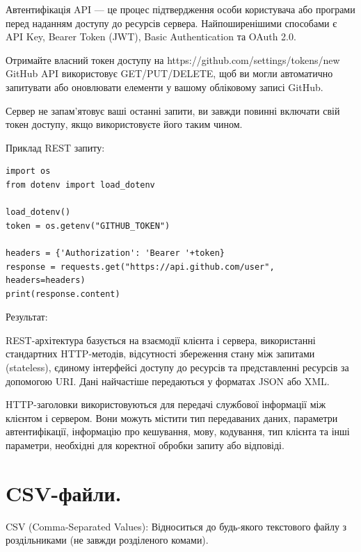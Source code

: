 Автентифікація API — це процес підтвердження особи користувача або програми перед 
наданням доступу до ресурсів сервера. Найпоширенішими способами є API Key, Bearer 
Token (JWT), Basic Authentication та OAuth 2.0.

Отримайте власний токен доступу на https://github.com/settings/tokens/new GitHub API 
використовує GET/PUT/DELETE, щоб ви могли автоматично запитувати або оновлювати 
елементи у вашому обліковому записі GitHub. 

 Сервер не запам'ятовує 
ваші останні запити, ви завжди повинні включати свій токен доступу, 
якщо використовуєте його таким чином.

Приклад REST запиту:

\begin{lstlisting}
import os
from dotenv import load_dotenv

load_dotenv()
token = os.getenv("GITHUB_TOKEN")

headers = {'Authorization': 'Bearer '+token}
response = requests.get("https://api.github.com/user", headers=headers)
print(response.content)
\end{lstlisting}

Результат:

\begin{console}
b'{"login":"maxvonlancaster","id":38358502,"node_id":"MDQ6VXNlcjM4MzU4NTAy","avatar_url": ...
\end{console}

REST-архітектура базується на взаємодії клієнта і сервера, використанні стандартних HTTP-методів, 
відсутності збереження стану між запитами (stateless), єдиному інтерфейсі доступу до ресурсів та 
представленні ресурсів за допомогою URI. Дані найчастіше передаються у форматах JSON або XML.

HTTP-заголовки використовуються для передачі службової інформації між клієнтом і сервером. 
Вони можуть містити тип передаваних даних, параметри автентифікації, інформацію про кешування, 
мову, кодування, тип клієнта та інші параметри, необхідні для коректної обробки запиту або відповіді.



\section{CSV-файли.}

CSV (Comma-Separated Values): Відноситься до будь-якого текстового файлу з роздільниками 
(не завжди розділеного комами).

